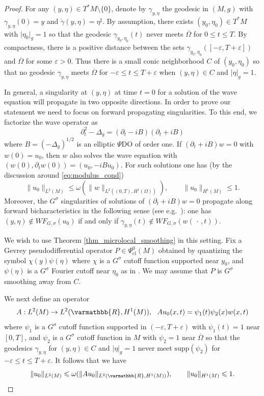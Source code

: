 \documentclass[12pt,twoside]{amsart}
\numberwithin{equation}{section}
\renewcommand{\leq}{\leqslant}
\renewcommand{\mathbb}{\varmathbb}
\newcommand {\p} {\partial}
\newcommand{\mR}{\mathbb{R}}                    %
\newcommand{\abs}[1]{\lvert #1 \rvert}          %
\newcommand{\norm}[1]{\lVert #1 \rVert}         %
\newcommand{\ol}[1]{\overline{#1}}
\newcommand{\eps}{\varepsilon}
\newcommand{\supp}{\mathrm{supp}}
\begin{document}
\begin{proof}
For any $(y, \eta) \in T^* M \setminus \{0\}$, denote by $\gamma_{y,\eta}$ the geodesic in $(M,g)$ with $\gamma_{y,\eta}(0) = y$ and $\dot{\gamma}(y,\eta) = \eta^{\sharp}$. By assumption, there exists $(y_0, \eta_0) \in T^* M$ with $\abs{\eta_0}_g = 1$ so that the geodesic $\gamma_{y_0,\eta_0}(t)$ never meets $\ol{\Omega}$ for $0 \leq t \leq T$. By compactness, there is a positive distance between the sets $\gamma_{y_0,\eta_0}([-\eps,T+\eps])$ and $\ol{\Omega}$ for some $\eps > 0$. Thus there is a small conic neighborhood $C$ of $(y_0,\eta_0)$ so that no geodesic $\gamma_{y,\eta}$ meets $\ol{\Omega}$ for $-\eps \leq t \leq T+\eps$ when $(y,\eta) \in C$ and $\abs{\eta}_g = 1$.

In general, a singularity at $(y,\eta)$ at time $t=0$ for a solution of the wave equation will propagate in two opposite directions. In order to prove our statement we need to focus on forward propagating singularities. To this end, we factorize the wave operator as 
\[
\p_t^2 - \Delta_g = (\p_t - iB)(\p_t + iB)
\]
where $B = (-\Delta_g)^{1/2}$ is an elliptic $\Psi$DO of order one. If $(\p_t + iB) w = 0$ with $w(0) = u_0$, then $w$ also solves the wave equation with $(w(0), \p_t w(0)) = (u_0, -iBu_0)$. For such solutions one has (by the discussion around \eqref{eq:modulus_cond})  
\[
\norm{u_0}_{L^2(M)} \leq \omega(\|w\|_{L^2((0,T),H^1(\Omega))}), \qquad \norm{u_0}_{H^1(M)} \leq 1.
\]
Moreover, the $G^{\sigma}$ singularities of solutions of $(\p_t + iB) w = 0$ propagate along forward bicharacteristics in the following sense (see e.g.\ \cite[Theorem 1 in Lecture VI]{Mizohata}): one has $(y, \eta) \notin WF_{G,\sigma}(u_0)$ if and only if $\gamma_{y,\eta}(t) \notin WF_{G,\sigma}(w(\,\cdot\,,t))$.

We wish to use Theorem \ref{thm_microlocal_smoothing} in this setting. Fix a Gevrey pseudodifferential operator $P \in \Psi^0_{\mathrm{cl}}(M)$ obtained by quantizing the symbol $\chi(y) \psi(\eta)$ where $\chi$ is a $G^{\sigma}$ cutoff function supported near $y_0$, and $\psi(\eta)$ is a $G^{\sigma}$ Fourier cutoff near $\eta_0$ as in \cite[Proposition 3.4.4]{Rodino_book}. We may assume that $P$ is $G^{\sigma}$ smoothing away from $C$.

We next define an operator 
\[
A: L^2(M) \to L^2(\mR,H^1(M)), \ \ Au_0(x,t) = \psi_1(t) \psi_2(x) w(x,t)
\]
where $\psi_1$ is a $G^{\sigma}$ cutoff function supported in $(-\eps,T+\eps)$ with $\psi_1(t) = 1$ near $[0, T]$, and $\psi_2$ is a $G^{\sigma}$ cutoff function in $M$ with $\psi_2 = 1$ near $\ol{\Omega}$ so that the geodesics $\gamma_{y,\eta}$ for $(y,\eta) \in C$ and $\abs{\eta}_g = 1$ never meet $\supp(\psi_2)$ for $-\eps \leq t \leq T+\eps$. It follows that we have 
\[
\norm{u_0}_{L^2(M)} \leq \omega(\|Au_0\|_{L^2(\mR,H^1(M))}), \qquad \norm{u_0}_{H^1(M)} \leq 1.
\]


\end{proof}
\end{document}

